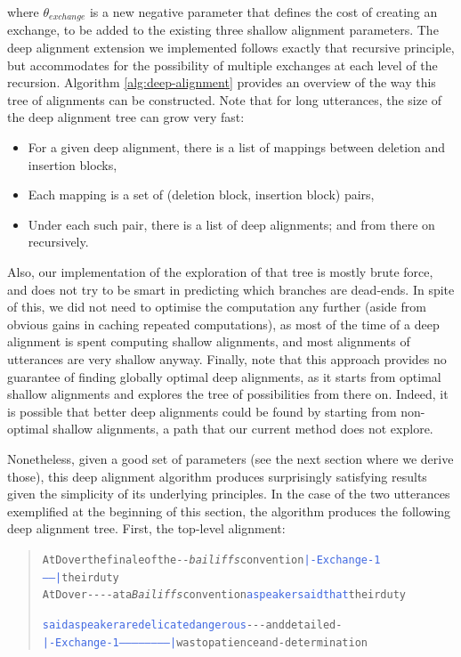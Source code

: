 where \(\theta_{exchange}\) is a new negative parameter that defines the
cost of creating an exchange, to be added to the existing three shallow
alignment parameters. The deep alignment extension we implemented
follows exactly that recursive principle, but accommodates for the
possibility of multiple exchanges at each level of the recursion.
Algorithm \ref{alg:deep-alignment} provides an overview of the way this
tree of alignments can be constructed. Note that for long utterances,
the size of the deep alignment tree can grow very fast:

\begin{itemize}
\item
  For a given deep alignment, there is a list of mappings between
  deletion and insertion blocks,
\item
  Each mapping is a set of (deletion block, insertion block) pairs,
\item
  Under each such pair, there is a list of deep alignments; and from
  there on recursively.
\end{itemize}



Also, our implementation of the exploration of that tree is mostly brute
force, and does not try to be smart in predicting which branches are
dead-ends. In spite of this, we did not need to optimise the computation
any further (aside from obvious gains in caching repeated computations),
as most of the time of a deep alignment is spent computing shallow
alignments, and most alignments of utterances are very shallow anyway.
Finally, note that this approach provides no guarantee of finding
globally optimal deep alignments, as it starts from optimal shallow
alignments and explores the tree of possibilities from there on. Indeed,
it is possible that better deep alignments could be found by starting
from non-optimal shallow alignments, a path that our current method does
not explore.

Nonetheless, given a good set of parameters (see the next section where
we derive those), this deep alignment algorithm produces surprisingly
satisfying results given the simplicity of its underlying principles. In
the case of the two utterances exemplified at the beginning of this
section, the algorithm produces the following deep alignment tree.
First, the top-level alignment:

\begin{quote}\begin{alltt}\small
At Dover \textcolor{BrickRed}{the finale of the} -  - \emph{\textcolor{Sepia}{bailiffs}} convention \textcolor{RoyalBlue}{|-Exchange-1------|} their duty
At Dover -   -      -  -   \textcolor{OliveGreen}{at a} \emph{\textcolor{Sepia}{Bailiffs}} convention \textcolor{RoyalBlue}{a speaker said that} their duty

\textcolor{RoyalBlue}{said a speaker are delicate dangerous} -   -  -        and \textcolor{BrickRed}{detailed} -            
\textcolor{RoyalBlue}{|-Exchange-1------------------------|} \textcolor{OliveGreen}{was to patience} and -        \textcolor{OliveGreen}{determination}
\end{alltt}\end{quote}

